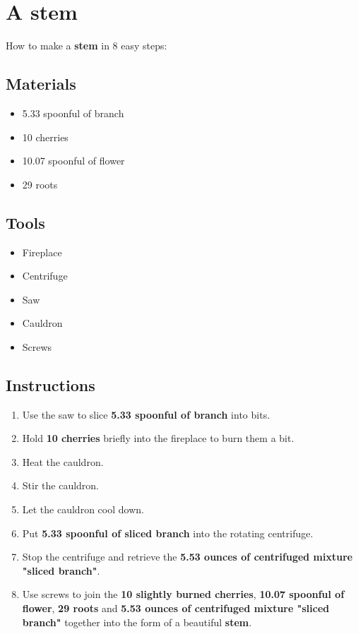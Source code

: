 \documentclass{article}
\begin{document}
\section{A stem}How to make a \textbf{stem} in 8 easy steps:

\subsection{Materials}\begin{itemize}
\item 
5.33 spoonful of branch
\item 
10 cherries
\item 
10.07 spoonful of flower
\item 
29 roots
\end{itemize}
\subsection{Tools}\begin{itemize}
\item 
Fireplace
\item 
Centrifuge
\item 
Saw
\item 
Cauldron
\item 
Screws
\end{itemize}
\subsection{Instructions}\begin{enumerate}
\item 
Use the saw to slice \textbf{5.33 spoonful of branch} into bits.
\item 
Hold \textbf{10 cherries} briefly into the fireplace to burn them a bit.
\item 
Heat the cauldron.
\item 
Stir the cauldron.
\item 
Let the cauldron cool down.
\item 
Put \textbf{5.33 spoonful of sliced branch} into the rotating centrifuge.
\item 
Stop the centrifuge and retrieve the \textbf{5.53 ounces of centrifuged mixture "sliced branch"}.
\item 
Use screws to join the \textbf{10 slightly burned cherries}, \textbf{10.07 spoonful of flower}, \textbf{29 roots} and \textbf{5.53 ounces of centrifuged mixture "sliced branch"} together into the form of a beautiful \textbf{stem}.
\end{enumerate}
\newpage
\end{document}
